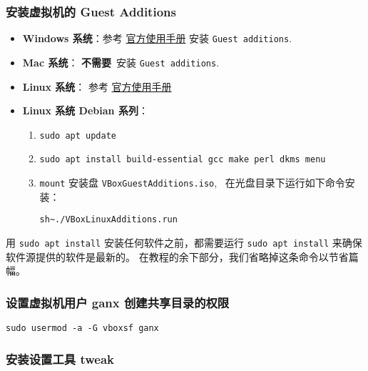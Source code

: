 \documentclass[
    11pt,
    cite=authoryear,
    device=phone,
    lang=cn,
    mode=simple,
    result=answer,
    toc=onecol,
]{elegantbook_sierxue}
\begin{document}
\subsubsection{安装虚拟机的 Guest Additions}%
\label{ssub:vbox-guest-additions}
\begin{itemize}
    \item \textbf{Windows 系统}：参考
        \href{https://www.virtualbox.org/manual/UserManual.html#additions-windows}{官方使用手册}
        安装 \lstinline{Guest additions}.
    \item \textbf{Mac 系统}： \textbf{不需要}~安装
        \lstinline{Guest additions}.
    \item \textbf{Linux 系统}： 参考
        \href{https://www.virtualbox.org/manual/UserManual.html#additions-linux}{官方使用手册}
    \item \textbf{Linux 系统 Debian 系列}：
        \begin{enumerate}
            \item \lstinline{sudo apt update}
            \item \lstinline{sudo apt install build-essential gcc make perl dkms menu}
            \item \lstinline{mount} 安装盘
                \lstinline{VBoxGuestAdditions.iso},~%
                在光盘目录下运行如下命令安装：
                 \begin{center}\label{center:vm-guest-additions}
                     \lstinline{sh~./VBoxLinuxAdditions.run}
                 \end{center}
        \end{enumerate}
\end{itemize}
\begin{note}\label{note:ubuntu-update}
    用 \lstinline{sudo apt install} 安装任何软件之前，都需要运行
    \lstinline{sudo apt install} 来确保软件源提供的软件是最新的。
    在教程的余下部分，我们省略掉这条命令以节省篇幅。
\end{note}

\subsubsection{设置虚拟机用户 ganx 创建共享目录的权限}%
\label{ssub:vbox-ganx-vboxsf}
\lstinline{sudo usermod -a -G vboxsf ganx}

\subsubsection{安装设置工具 tweak}%
\label{ssub:vm-treak}
\end{document}
